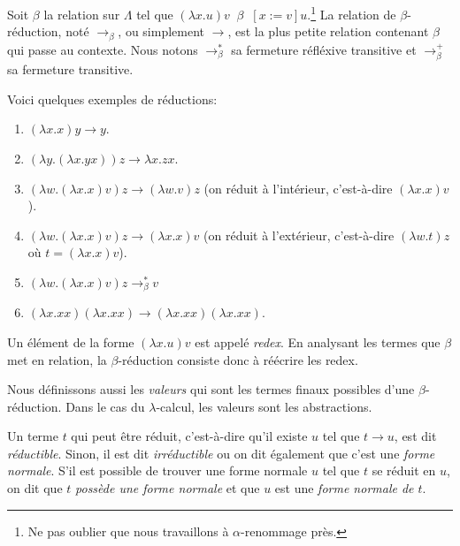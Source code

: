 \begin{definition} 
  Soit $\beta$ la relation sur $\Lambda$ tel que $(\lambda x . u) v \; \; \beta 
  \; \; [x := v]u$.\footnote{Ne pas oublier que nous travaillons à
    $\alpha$-renommage près.}
  La relation de $\beta$-réduction, noté $\rightarrow_{\beta}$, ou simplement
  $\rightarrow$, est la plus petite relation contenant $\beta$ qui passe au
  contexte. Nous notons $\rightarrow^{*}_{\beta}$ sa fermeture réfléxive
  transitive et $\rightarrow^{+}_{\beta}$ sa fermeture transitive.
\end{definition}

Voici quelques exemples de réductions:
\begin{exemple}
  \begin{enumerate}
  \item $(\lambda x . x) y \rightarrow y$.
  \item $(\lambda y . (\lambda x . y x)) z \rightarrow \lambda x . z x$.
  \item $(\lambda w . (\lambda x . x) v) z \rightarrow (\lambda w. v) z$ (on
    réduit à l'intérieur, c'est-à-dire $(\lambda x . x) v$).
  \item $(\lambda w . (\lambda x . x) v) z \rightarrow (\lambda x. x) v$ (on
    réduit à l'extérieur, c'est-à-dire $(\lambda w . t) z$ où $t = (\lambda x .
    x) v$).
  \item $(\lambda w . (\lambda x . x) v) z \rightarrow^{*}_{\beta} v$
  \item $(\lambda x . xx) (\lambda x . xx) \rightarrow (\lambda x . xx)
    (\lambda x . xx)$.
  \end{enumerate}
\end{exemple}

Un élément de la forme $(\lambda x . u) v$ est appelé \textit{redex}. En
analysant les termes que $\beta$ met en relation, la
$\beta$-réduction consiste donc à réécrire les redex.

Nous définissons aussi les \textit{valeurs} qui sont les termes finaux
possibles d'une $\beta$-réduction. Dans le cas du $\lambda$-calcul, les valeurs
sont les abstractions.

Un terme $t$ qui peut être réduit, c'est-à-dire qu'il existe $u$ tel que $t
\rightarrow u$, est dit \textit{réductible}. Sinon, il est dit
\textit{irréductible} ou on dit également que c'est une \textit{forme normale}.
S'il est possible de trouver une forme normale $u$ tel que $t$ se réduit en $u$,
on dit que $t$ \textit{possède une forme normale} et que $u$ est une
\textit{forme normale de $t$}.

